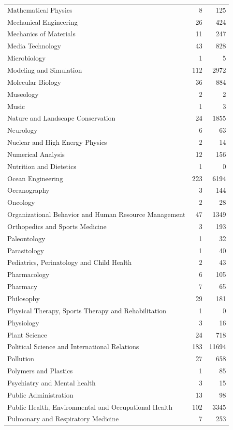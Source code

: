 \documentclass[
  12pt,
]{article}
\begin{document}
\begin{longtable}[t]{|>{}lr>{}r|}
Mathematical Physics & 8 & 125\\
Mechanical Engineering & 26 & 424\\
Mechanics of Materials & 11 & 247\\
Media Technology & 43 & 828\\
Microbiology & 1 & 5\\
Modeling and Simulation & 112 & 2972\\
Molecular Biology & 36 & 884\\
Museology & 2 & 2\\
Music & 1 & 3\\
Nature and Landscape Conservation & 24 & 1855\\
Neurology & 6 & 63\\
Nuclear and High Energy Physics & 2 & 14\\
Numerical Analysis & 12 & 156\\
Nutrition and Dietetics & 1 & 0\\
Ocean Engineering & 223 & 6194\\
Oceanography & 3 & 144\\
Oncology & 2 & 28\\
Organizational Behavior and Human Resource Management & 47 & 1349\\
Orthopedics and Sports Medicine & 3 & 193\\
Paleontology & 1 & 32\\
Parasitology & 1 & 40\\
Pediatrics, Perinatology and Child Health & 2 & 43\\
Pharmacology & 6 & 105\\
Pharmacy & 7 & 65\\
Philosophy & 29 & 181\\
Physical Therapy, Sports Therapy and Rehabilitation & 1 & 0\\
Physiology & 3 & 16\\
Plant Science & 24 & 718\\
Political Science and International Relations & 183 & 11694\\
Pollution & 27 & 658\\
Polymers and Plastics & 1 & 85\\
Psychiatry and Mental health & 3 & 15\\
Public Administration & 13 & 98\\
Public Health, Environmental and Occupational Health & 102 & 3345\\
Pulmonary and Respiratory Medicine & 7 & 253\\

\end{longtable}
\end{document}
